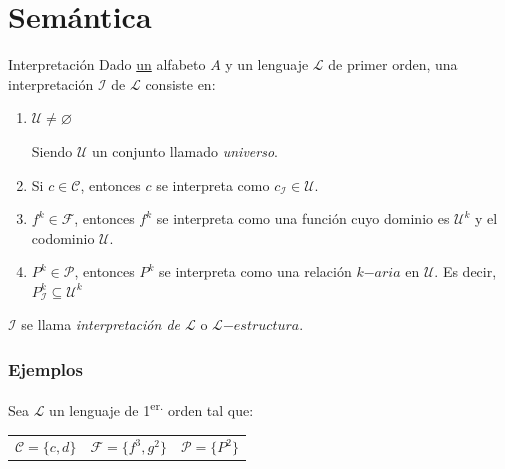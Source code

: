 \section{Semántica}

\begin{definicion}{Interpretación}{}
    Dado \underline{un} alfabeto $A$ y un lenguaje $\mathcal{L}$ de primer
    orden, una interpretación $\mathcal{I}$ de $\mathcal{L}$ consiste en:

    \begin{enumerate}
        \item $\mathcal{U} \neq \varnothing$

            Siendo $\mathcal{U}$ un conjunto llamado \textit{universo}.

        \item Si $c \in \mathcal{C}$, entonces $c$ se interpreta como 
            $c_{\mathcal{I}} \in \mathcal{U}$.

        \item $f^{k} \in \mathcal{F}$, entonces $f^{k}$ se interpreta como una
            función cuyo dominio es $\mathcal{U}^{k}$ y el codominio
            $\mathcal{U}$. 
    
        \item $P^k \in \mathcal{P}$, entonces $P^k$ se
            interpreta como una relación $k\mathrm{-}aria$ en $\mathcal{U}$.
            Es decir, $P_\mathcal{I}^{k} \subseteq \mathcal{U}^k$
    \end{enumerate}

    \medskip

    $\mathcal{I}$ se llama \textit{interpretación de $\mathcal{L}$} o
   $\mathcal{L}\mathrm{-}estructura$.
\end{definicion}

\subsubsection{Ejemplos}

Sea $\mathcal{L}$ un lenguaje de 1\textsuperscript{er.} orden tal que:

\begin{center}
    \begin{tabular}{c c c}
        $\mathcal{C} = \{ c,d \}$ & $\mathcal{F} = \{ f^3 , g^2 \}$
        & $\mathcal{P} = \{ P^2 \}$
    \end{tabular}
\end{center}

